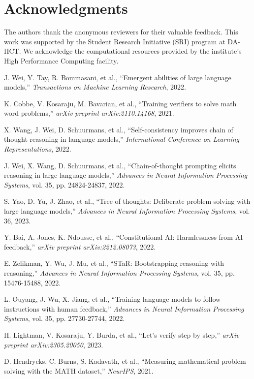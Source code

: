 \documentclass[10pt,twocolumn]{article}
\begin{document}
\section*{Acknowledgments}

The authors thank the anonymous reviewers for their valuable feedback. This work was supported by the Student Research Initiative (SRI) program at DA-IICT. We acknowledge the computational resources provided by the institute's High Performance Computing facility.

\begin{thebibliography}{99}

J. Wei, Y. Tay, R. Bommasani, et al., ``Emergent abilities of large language models,'' \emph{Transactions on Machine Learning Research}, 2022.

K. Cobbe, V. Kosaraju, M. Bavarian, et al., ``Training verifiers to solve math word problems,'' \emph{arXiv preprint arXiv:2110.14168}, 2021.

X. Wang, J. Wei, D. Schuurmans, et al., ``Self-consistency improves chain of thought reasoning in language models,'' \emph{International Conference on Learning Representations}, 2022.

J. Wei, X. Wang, D. Schuurmans, et al., ``Chain-of-thought prompting elicits reasoning in large language models,'' \emph{Advances in Neural Information Processing Systems}, vol. 35, pp. 24824-24837, 2022.

S. Yao, D. Yu, J. Zhao, et al., ``Tree of thoughts: Deliberate problem solving with large language models,'' \emph{Advances in Neural Information Processing Systems}, vol. 36, 2023.

Y. Bai, A. Jones, K. Ndousse, et al., ``Constitutional AI: Harmlessness from AI feedback,'' \emph{arXiv preprint arXiv:2212.08073}, 2022.

E. Zelikman, Y. Wu, J. Mu, et al., ``STaR: Bootstrapping reasoning with reasoning,'' \emph{Advances in Neural Information Processing Systems}, vol. 35, pp. 15476-15488, 2022.

L. Ouyang, J. Wu, X. Jiang, et al., ``Training language models to follow instructions with human feedback,'' \emph{Advances in Neural Information Processing Systems}, vol. 35, pp. 27730-27744, 2022.

H. Lightman, V. Kosaraju, Y. Burda, et al., ``Let's verify step by step,'' \emph{arXiv preprint arXiv:2305.20050}, 2023.

D. Hendrycks, C. Burns, S. Kadavath, et al., ``Measuring mathematical problem solving with the MATH dataset,'' \emph{NeurIPS}, 2021.

\end{thebibliography}
\end{document}
